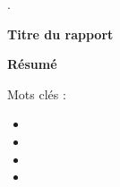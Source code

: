 \begin{titlepage}.
    

    \vspace{3cm}

    \begin{Large}
        \begin{center}
            \textbf{Titre du rapport}
        \end{center}
        \makeatletter
        \noindent\@title
        \makeatother
    \end{Large}

    \vspace{0.5cm}

    \begin{large}
        \begin{center}
            \textbf{Résumé}
        \end{center}

        \makeatletter
        \@abstracttext
        \makeatother
    \end{large}

    \vspace{1.5cm}

    \begin{Large}
        Mots clés :
        \begin{itemize}
            \item \makeatletter \@keywordone \makeatother
            \item \makeatletter \@keywordtwo \makeatother
            \item \makeatletter \@keywordthree \makeatother
            \item \makeatletter \@keywordfour \makeatother
        \end{itemize}
    \end{Large}   
\end{titlepage}